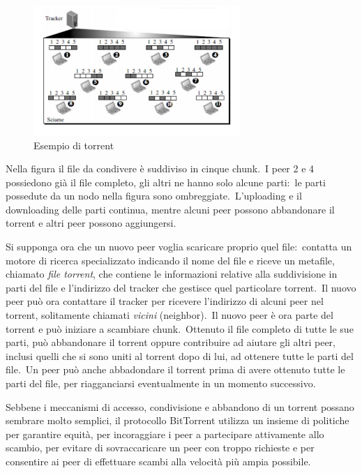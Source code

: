 \begin{figure}[H]
    \centering
    \includegraphics[width=0.7\textwidth]{immagini/BitTorrent.png}
    \caption{Esempio di torrent }
    \label{fig:BitTorrent}
\end{figure}

Nella figura il file da condivere è suddiviso in cinque chunk.\
I peer 2 e 4 possiedono già il file completo, gli altri ne hanno solo alcune parti:\ le parti possedute da un nodo nella figura sono ombreggiate.\
L'uploading e il downloading delle parti continua, mentre alcuni peer possono abbandonare il torrent e altri peer possono aggiungersi.

Si supponga ora che un nuovo peer voglia scaricare proprio quel file:\ contatta un motore di ricerca specializzato indicando il nome del file e riceve un metafile, chiamato \emph{file torrent}, che contiene le informazioni relative alla suddivisione in parti del file e l'indirizzo del tracker che gestisce quel particolare torrent.\
Il nuovo peer può ora contattare il tracker per ricevere l'indirizzo di alcuni peer nel torrent, solitamente chiamati \emph{vicini} (neighbor).\
Il nuovo peer è ora parte del torrent e può iniziare a scambiare chunk.\
Ottenuto il file completo di tutte le sue parti, può abbandonare il torrent oppure contribuire ad aiutare gli altri peer, inclusi quelli che si sono uniti al torrent dopo di lui, ad ottenere tutte le parti del file.\
Un peer può anche abbadondare il torrent prima di avere ottenuto tutte le parti del file, per riagganciarsi eventualmente in un momento successivo.

Sebbene i meccanismi di accesso, condivisione e abbandono di un torrent possano sembrare molto semplici, il protocollo BitTorrent utilizza un insieme di politiche per garantire equità, per incoraggiare i peer a partecipare attivamente allo scambio, per evitare di sovraccaricare un peer con troppo richieste e per consentire ai peer di effettuare scambi alla velocità più ampia possibile.

